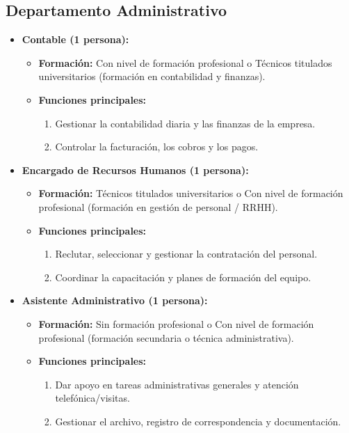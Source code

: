 \subsection{Departamento Administrativo}
\begin{itemize}[leftmargin=*]
    \item \textbf{Contable (1 persona):}
          \begin{itemize}
              \item \textbf{Formación:} Con nivel de formación profesional o Técnicos titulados universitarios (formación en contabilidad y finanzas).
              \item \textbf{Funciones principales:}
                    \begin{enumerate}
                        \item Gestionar la contabilidad diaria y las finanzas de la empresa.
                        \item Controlar la facturación, los cobros y los pagos.
                    \end{enumerate}
          \end{itemize}

    \item \textbf{Encargado de Recursos Humanos (1 persona):}
          \begin{itemize}
              \item \textbf{Formación:} Técnicos titulados universitarios o Con nivel de formación profesional (formación en gestión de personal / RRHH).
              \item \textbf{Funciones principales:}
                    \begin{enumerate}
                        \item Reclutar, seleccionar y gestionar la contratación del personal.
                        \item Coordinar la capacitación y planes de formación del equipo.
                    \end{enumerate}
          \end{itemize}

    \item \textbf{Asistente Administrativo (1 persona):}
          \begin{itemize}
              \item \textbf{Formación:} Sin formación profesional o Con nivel de formación profesional (formación secundaria o técnica administrativa).
              \item \textbf{Funciones principales:}
                    \begin{enumerate}
                        \item Dar apoyo en tareas administrativas generales y atención telefónica/visitas.
                        \item Gestionar el archivo, registro de correspondencia y documentación.
                    \end{enumerate}
          \end{itemize}
\end{itemize}

